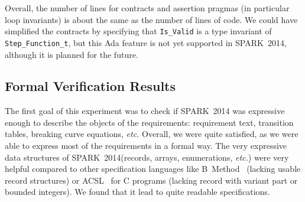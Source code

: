 \documentclass[10pt,a4paper,twocolumn]{article}
\newcommand{\newspark}{SPARK~2014\xspace}
\newcommand{\etc}{\textit{etc.}\xspace}
\newcommand{\SPARK}[1]{\lstinline[language=Ada,basicstyle={\footnotesize
      \sffamily},framesep=0pt]$#1$}
\begin{document}


Overall, the number of lines for contracts and assertion pragmas (in particular
loop invariants) is about the same as the number of lines of code. We could
have simplified the contracts by specifying that \SPARK{Is_Valid} is a type
invariant of \SPARK{Step_Function_t}, but this Ada feature is not yet supported
in \newspark, although it is planned for the future.

\subsection{Formal Verification Results}

The first goal of this experiment was to check if \newspark was
expressive enough to describe the objects of the requirements:
requirement text, transition tables, breaking curve equations, \etc
Overall, we were quite satisfied, as we were able to express most of
the requirements in a formal way. The very expressive data structures
of \newspark (records, arrays, enumerations, \etc) were very helpful
compared to other specification languages like B~Method~\cite{b-book}
(lacking usable record structures) or ACSL~\cite{acsl} for C programs
(lacking record with variant part or bounded integers).
We found that it lead to quite readable specifications.
\end{document}

